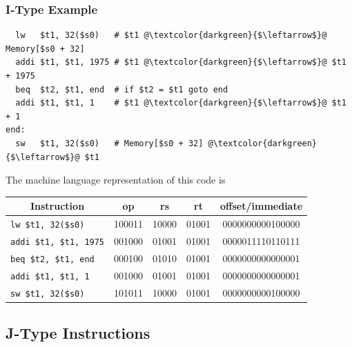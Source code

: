 \documentclass{beamer}
\begin{document}
\begin{frame}[fragile]
\frametitle{I-Type Example}

\scriptsize

\begin{lstlisting}
  lw   $t1, 32($s0)   # $t1 @\textcolor{darkgreen}{$\leftarrow$}@ Memory[$s0 + 32]
  addi $t1, $t1, 1975 # $t1 @\textcolor{darkgreen}{$\leftarrow$}@ $t1 + 1975
  beq  $t2, $t1, end  # if $t2 = $t1 goto end
  addi $t1, $t1, 1    # $t1 @\textcolor{darkgreen}{$\leftarrow$}@ $t1 + 1
end:
  sw   $t1, 32($s0)   # Memory[$s0 + 32] @\textcolor{darkgreen}{$\leftarrow$}@ $t1
\end{lstlisting}

\vspace{0.5cm}

The machine language representation of this code is\\
\vspace{0.2cm}

\begin{center}
\begin{tabular}{|l|c|c|c|c|}
  \hline
  \multicolumn{1}{|c|}{Instruction} & op & rs & rt & offset/immediate\\
  \hline
  \hline
  \lstinline!lw $t1, 32($s0)! & 100011 & 10000 & 01001 & 0000000000100000 \\
  \hline
  \lstinline!addi $t1, $t1, 1975! & 001000 & 01001 & 01001 & 0000011110110111\\
  \hline
  \lstinline!beq $t2, $t1, end! & 000100 & 01010 & 01001 & 0000000000000001\\
  \hline
  \lstinline!addi $t1, $t1, 1! & 001000 & 01001 & 01001 & 0000000000000001\\
  \hline
  \lstinline!sw $t1, 32($s0)! & 101011 & 10000 & 01001 & 0000000000100000\\
  \hline
\end{tabular}
\end{center}

\end{frame}

\subsection{J-Type Instructions}
\end{document}
